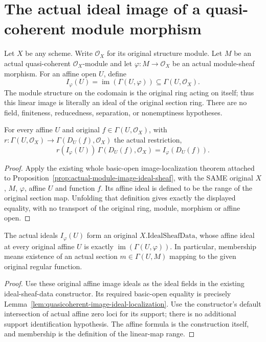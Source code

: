 \section{The actual ideal image of a quasi-coherent module morphism}
Let $X$ be any scheme. Write $\mathcal O_X$ for its original structure module.
Let $M$ be an actual quasi-coherent $\mathcal O_X$-module and let
$\varphi:M\to\mathcal O_X$ be an actual module-sheaf morphism.
For an affine open $U$, define
\[
 I_\varphi(U)=\operatorname{im}(\Gamma(U,\varphi))\subseteq\Gamma(U,\mathcal O_X).
\]
The module structure on the codomain is the original ring acting on itself;
thus this linear image is literally an ideal of the original section ring.
There are no field, finiteness, reducedness, separation, or nonemptiness hypotheses.

\begin{lemma}
\label{lem:quasicoherent-image-ideal-localization}
For every affine $U$ and original $f\in\Gamma(U,\mathcal O_X)$, with
$r:\Gamma(U,\mathcal O_X)\to\Gamma(D_U(f),\mathcal O_X)$ the actual restriction,
\[
 r(I_\varphi(U))\,\Gamma(D_U(f),\mathcal O_X)=I_\varphi(D_U(f)).
\]
\end{lemma}
\begin{proof}
Apply the existing whole basic-open image-localization theorem
attached to Proposition~\ref{prop:actual-module-image-ideal-sheaf},
with the SAME original $X$, $M$, $\varphi$, affine $U$ and function $f$.
Its affine ideal is defined to be the range of the original section map.
Unfolding that definition gives exactly the displayed equality, with
no transport of the original ring, module, morphism or affine open.
\end{proof}

\begin{theorem}
\label{thm:quasicoherent-image-ideal}
\leanok
{}
The actual ideals $I_\varphi(U)$ form an original $X.\mathrm{IdealSheafData}$,
whose affine ideal at every original affine $U$ is exactly
$\operatorname{im}(\Gamma(U,\varphi))$. In particular, membership means
existence of an actual section $m\in\Gamma(U,M)$ mapping to the given
original regular function.
\end{theorem}
\begin{proof}
Use these original affine image ideals as the ideal fields in the existing
ideal-sheaf-data constructor. Its required basic-open equality is precisely
Lemma~\ref{lem:quasicoherent-image-ideal-localization}. Use the constructor's
default intersection of actual affine zero loci for its support; there is no
additional support identification hypothesis. The affine formula is the
construction itself, and membership is the definition of the linear-map range.
\end{proof}

